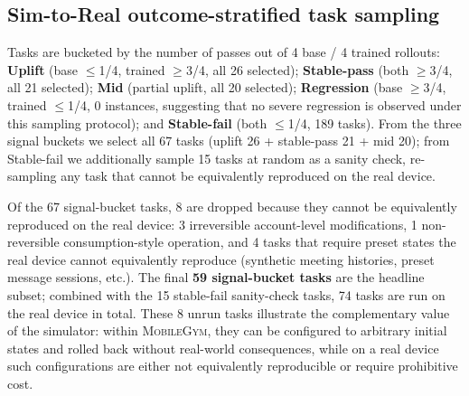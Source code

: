 \documentclass{llmxive}
\providecommand{\sys}{\textsc{MobileGym}}
\begin{document}
\begin{table}[!htbp]
  \centering\small
  \setlength{\tabcolsep}{3pt}
  \caption{Sim-to-Real training gain on the simulation side, broken down by difficulty (256-task test set)}
  \label{tab:sim2real-by-level}
\end{table}

\subsection{Sim-to-Real outcome-stratified task sampling}\label{app:sim2real-buckets}

Tasks are bucketed by the number of passes out of 4 base / 4 trained rollouts: \textbf{Uplift} (base $\leq$1/4, trained $\geq$3/4, all 26 selected); \textbf{Stable-pass} (both $\geq$3/4, all 21 selected); \textbf{Mid} (partial uplift, all 20 selected); \textbf{Regression} (base $\geq$3/4, trained $\leq$1/4, 0 instances, suggesting that no severe regression is observed under this sampling protocol); and \textbf{Stable-fail} (both $\leq$1/4, 189 tasks). From the three signal buckets we select all 67 tasks (uplift 26 + stable-pass 21 + mid 20); from Stable-fail we additionally sample 15 tasks at random as a sanity check, re-sampling any task that cannot be equivalently reproduced on the real device.

Of the 67 signal-bucket tasks, 8 are dropped because they cannot be equivalently reproduced on the real device: 3 irreversible account-level modifications, 1 non-reversible consumption-style operation, and 4 tasks that require preset states the real device cannot equivalently reproduce (synthetic meeting histories, preset message sessions, etc.). The final \textbf{59 signal-bucket tasks} are the headline subset; combined with the 15 stable-fail sanity-check tasks, 74 tasks are run on the real device in total. These 8 unrun tasks illustrate the complementary value of the simulator: within \sys{}, they can be configured to arbitrary initial states and rolled back without real-world consequences, while on a real device such configurations are either not equivalently reproducible or require prohibitive cost.
\end{document}

